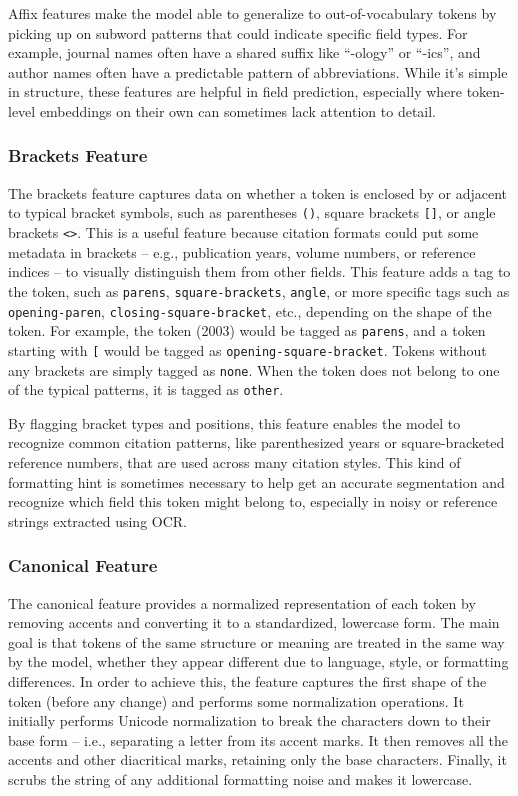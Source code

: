 Affix features make the model able to generalize to out-of-vocabulary tokens by picking up on subword patterns that could indicate specific field types. For example, journal names often have a shared suffix like “-ology” or “-ics”, and author names often have a predictable pattern of abbreviations. While it’s simple in structure, these features are helpful in field prediction, especially where token-level embeddings on their own can sometimes lack attention to detail.

\subsubsection{Brackets Feature}
The brackets feature captures data on whether a token is enclosed by or adjacent to typical bracket symbols, such as parentheses \texttt{()}, square brackets \texttt{[]}, or angle brackets \texttt{<>}. This is a useful feature because citation formats could put some metadata in brackets – e.g., publication years, volume numbers, or reference indices – to visually distinguish them from other fields.
This feature adds a tag to the token, such as \texttt{parens}, \texttt{square-brackets}, \texttt{angle}, or more specific tags such as \texttt{opening-paren}, \texttt{closing-square-bracket}, etc., depending on the shape of the token. For example, the token (2003) would be tagged as \texttt{parens}, and a token starting with \texttt{[} would be tagged as \texttt{opening-square-bracket}.
Tokens without any brackets are simply tagged as \texttt{none}. When the token does not belong to one of the typical patterns, it is tagged as \texttt{other}.

By flagging bracket types and positions, this feature enables the model to recognize common citation patterns, like parenthesized years or square-bracketed reference numbers, that are used across many citation styles. This kind of formatting hint is sometimes necessary to help get an accurate segmentation and recognize which field this token might belong to, especially in noisy or reference strings extracted using OCR.

\subsubsection{Canonical Feature}
The canonical feature provides a normalized representation of each token by removing accents and converting it to a standardized, lowercase form. The main goal is that tokens of the same structure or meaning are treated in the same way by the model, whether they appear different due to language, style, or formatting differences.
In order to achieve this, the feature captures the first shape of the token (before any change) and performs some normalization operations. It initially performs Unicode normalization to break the characters down to their base form – i.e., separating a letter from its accent marks. It then removes all the accents and other diacritical marks, retaining only the base characters.
Finally, it scrubs the string of any additional formatting noise and makes it lowercase.

